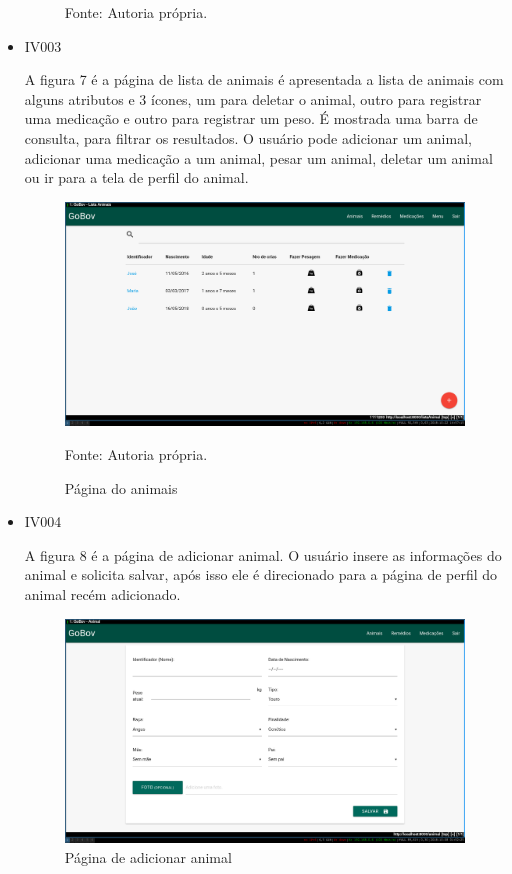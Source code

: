 \begin{itemize}
\begin{figure}[H]
\begin{center}
		Fonte: Autoria própria.
	\end{center}
\end{figure}

\item IV003

A figura 7 é a página de lista de animais é apresentada a lista de animais com alguns atributos e 3 ícones, um para deletar o animal, outro para registrar uma medicação e outro para registrar um peso. É mostrada uma barra de consulta, para filtrar os resultados. O usuário pode adicionar um animal, adicionar uma medicação a um animal, pesar um animal, deletar um animal ou ir para a tela de perfil do animal.
\begin{figure}[H]
	\begin{center}
		\caption{Página do animais}
		\includegraphics[width=\textwidth]{../img/prototipos/listaAnimal.png}

		Fonte: Autoria própria.
	\end{center}
\end{figure}

\item IV004

A figura 8 é a página de adicionar animal. O usuário insere as informações do animal e solicita salvar, após isso ele é direcionado para a página de perfil do animal recém adicionado.
\begin{figure}[H]
	\begin{center}
		\caption{Página de adicionar animal}
		\includegraphics[width=\textwidth]{../img/prototipos/addAnimal.png}


\end{center}
\end{figure}
\end{itemize}
